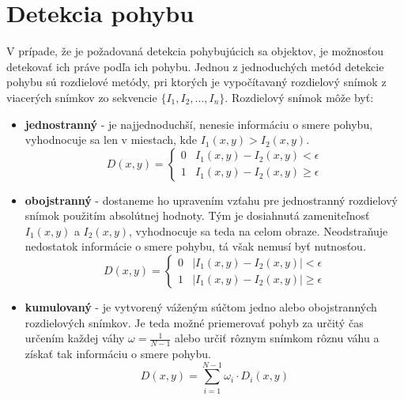 \section{Detekcia pohybu}

    V prípade, že je požadovaná detekcia pohybujúcich sa objektov, je možnosťou detekovať ich práve podľa ich pohybu. Jednou z jednoduchých metód detekcie pohybu sú rozdielové metódy, pri ktorých je vypočítavaný rozdielový snímok z viacerých snímkov zo sekvencie $\{I_1, I_2, ..., I_n\}$. Rozdielový snímok môže byť:

    \begin{itemize}
        \item \textbf{jednostranný} - je najjednoduchší, nenesie informáciu o smere pohybu, vyhodnocuje sa len v miestach, kde $I_1(x,y) > I_2(x,y)$.
        \begin{equation}
            D(x,y) = \begin{cases}
                0 & I_1(x,y) - I_2(x,y) < \epsilon \\
                1 & I_1(x,y) - I_2(x,y) \geq \epsilon
            \end{cases}
        \end{equation}

        \item \textbf{obojstranný} - dostaneme ho upravením vzťahu pre jednostranný rozdielový snímok  použitím absolútnej hodnoty. Tým je dosiahnutá zameniteľnosť $I_1(x,y)$ a $I_2(x,y)$, vyhodnocuje sa teda na celom obraze. Neodstraňuje nedostatok informácie o smere pohybu, tá však nemusí byť nutnosťou.
        \begin{equation}
            D(x,y) = \begin{cases}
                0 & |I_1(x,y) - I_2(x,y)| < \epsilon \\
                1 & |I_1(x,y) - I_2(x,y)| \geq \epsilon
            \end{cases}
        \end{equation}

        \item \textbf{kumulovaný} - je vytvorený váženým súčtom jedno alebo obojstranných rozdielových snímkov. Je teda možné priemerovať pohyb za určitý čas určením každej váhy $\omega = \frac{1}{N-1}$ alebo určiť rôznym snímkom rôznu váhu a získať tak informáciu o smere pohybu.
        \begin{equation}
            D(x,y) = \sum_{i=1}^{N-1}\omega_i \cdot D_i(x,y)
        \end{equation}
    \end{itemize}


